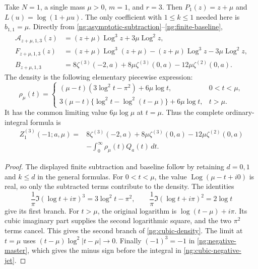 \documentclass[11pt,letterpaper]{article}
\numberwithin{equation}{section}
\theoremstyle{definition}
\theoremstyle{remark}
\DeclareMathOperator{\Log}{Log}
\begin{document}
Take $N=1$, a single mass $\mu>0$, $m=1$, and $r=3$.
Then $P_1(z)=z+\mu$ and $L(u)=\log(1+\mu u)$.
The only coefficient with $1\leq k\leq1$ needed here is
$b_{1,1}=\mu$.  Directly from
\eqref{ng:asymptotic-subtraction}--\eqref{ng:finite-baseline},
\begin{align}
 \mathcal A_{z+\mu,1,3}(z)
   &=(z+\mu)\Log^3z+3\mu\Log^2z,
 \label{ng:cubic-subtraction}\\
 F_{z+\mu,1,3}(z)
   &=(z+\mu)\Log^3(z+\mu)
          -(z+\mu)\Log^3z-3\mu\Log^2z,
 \label{ng:cubic-remainder}\\
 B_{z+\mu,1,3}
   &=8\zeta^{(3)}(-2,a)+8\mu\zeta^{(3)}(0,a)
                       -12\mu\zeta^{(2)}(0,a).
 \label{ng:cubic-baseline}
\end{align}
The density is the following elementary piecewise expression:
\begin{equation}
 \rho_\mu(t)=
 \begin{cases}
  (\mu-t)(3\log^2t-\pi^2)+6\mu\log t,
        &0<t<\mu,\\[3pt]
  3(\mu-t)\{\log^2t-\log^2(t-\mu)\}+6\mu\log t,
        &t>\mu.
 \end{cases}
 \label{ng:cubic-density}
\end{equation}
It has the common limiting value $6\mu\log\mu$ at $t=\mu$.
Thus the complete ordinary-integral formula is
\begin{equation}
 \begin{split}
 Z_1^{(3)}(-1;a,\mu)
   ={}&8\zeta^{(3)}(-2,a)+8\mu\zeta^{(3)}(0,a)
                          -12\mu\zeta^{(2)}(0,a)\\
      &-\int_0^{\infty}\rho_\mu(t)Q_a(t)\,dt.
 \end{split}
 \label{ng:cubic-negative-jet}
\end{equation}

\begin{proof}
The displayed finite subtraction and baseline follow by
retaining $d=0,1$ and $k\leq d$ in the general formulas.
For $0<t<\mu$, the value $\Log(\mu-t+i0)$ is real, so only
the subtracted terms contribute to the density.  The identities
\[
 \frac1\pi\Im(\log t+i\pi)^3=3\log^2t-\pi^2,
 \qquad
 \frac1\pi\Im(\log t+i\pi)^2=2\log t
\]
give its first branch.  For $t>\mu$, the original logarithm
is $\log(t-\mu)+i\pi$.  Its cubic imaginary part supplies the
second logarithmic square, and the two $\pi^2$ terms cancel.
This gives the second branch of \eqref{ng:cubic-density}.
The limit at $t=\mu$ uses
$(t-\mu)\log^2|t-\mu|\to0$.
Finally $(-1)^3=-1$ in \eqref{ng:negative-master}, which gives
the minus sign before the integral in
\eqref{ng:cubic-negative-jet}.
\end{proof}
\end{document}
